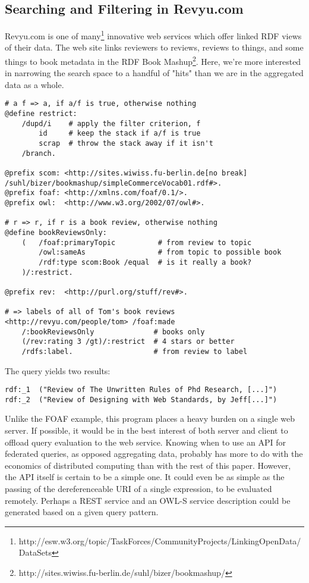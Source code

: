 \documentclass[runningheads]{llncs}
\begin{document}
\subsection{Searching and Filtering in Revyu.com}
Revyu.com is one of many\footnote{http://esw.w3.org/topic/TaskForces/CommunityProjects/LinkingOpenData/DataSets} innovative web services which offer linked RDF views of their data.  The web site links reviewers to reviews, reviews to things, and some things to book metadata in the RDF Book Mashup\footnote{http://sites.wiwiss.fu-berlin.de/suhl/bizer/bookmashup/}.  Here, we're 
more interested in narrowing the search space to a handful of "hits" than we are in the aggregated data as a whole.
\begin{verbatim}
# a f => a, if a/f is true, otherwise nothing
@define restrict:
    /dupd/i    # apply the filter criterion, f
        id     # keep the stack if a/f is true
        scrap  # throw the stack away if it isn't
    /branch.

@prefix scom: <http://sites.wiwiss.fu-berlin.de[no break]
/suhl/bizer/bookmashup/simpleCommerceVocab01.rdf#>.
@prefix foaf: <http://xmlns.com/foaf/0.1/>.
@prefix owl:  <http://www.w3.org/2002/07/owl#>.

# r => r, if r is a book review, otherwise nothing
@define bookReviewsOnly:
    (   /foaf:primaryTopic          # from review to topic
        /owl:sameAs                 # from topic to possible book
        /rdf:type scom:Book /equal  # is it really a book?
    )/:restrict.

@prefix rev:  <http://purl.org/stuff/rev#>.

# => labels of all of Tom's book reviews
<http://revyu.com/people/tom> /foaf:made
    /:bookReviewsOnly              # books only
    (/rev:rating 3 /gt)/:restrict  # 4 stars or better
    /rdfs:label.                   # from review to label
\end{verbatim}

The query yields two results:
\begin{verbatim}
rdf:_1  ("Review of The Unwritten Rules of Phd Research, [...]")
rdf:_2  ("Review of Designing with Web Standards, by Jeff[...]")
\end{verbatim}

Unlike the FOAF example, this program places a heavy burden on a single web server.  If possible, it would be in the best interest of both server and client to offload query evaluation to the web service.  Knowing when to use an API for federated queries, as opposed aggregating data, probably has more to do with the economics of distributed computing than with the rest of this paper.  However, the API itself is certain to be a simple one.  It could even be as simple as the passing of the dereferenceable URI of a single expression, to be evaluated remotely.  Perhaps a REST service and an OWL-S service description could be generated based on a given query pattern.
\end{document}
